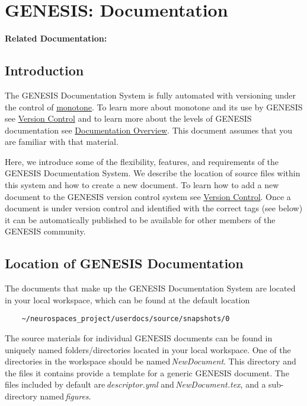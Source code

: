 \documentclass[12pt]{article}
\begin{document}
\section*{GENESIS: Documentation}

{\bf Related Documentation:}

\subsection*{Introduction}

The GENESIS Documentation System is fully automated with versioning under the control of \href{http://monotone.ca/}{monotone}. To learn more about monotone and its use by GENESIS see \href{../version-control/version-control.tex}{Version Control} and to learn more about the levels of GENESIS documentation see \href{../documentation-overview/documentation-overview.tex}{Documentation Overview}. This document assumes that you are familiar with that material.

Here, we introduce some of the flexibility, features, and requirements of the GENESIS Documentation System. We describe the location of source files within this system and how to create a new document. To learn how to add a new document to the GENESIS version control system see \href{../version-control/version-control.tex}{Version Control}. Once a document is under version control and identified with the correct tags (see below) it can be automatically published to be available for other members of the GENESIS community.

\subsection*{Location of GENESIS Documentation}

The documents that make up the GENESIS Documentation System are located in your local workspace, which can be found at the default location
\begin{verbatim}
    ~/neurospaces_project/userdocs/source/snapshots/0
\end{verbatim}
The source materials for individual GENESIS documents can be found in uniquely named folders/directories located in your local workspace. One of the directories in the workspace should be named\,{\it NewDocument}. This directory and the files it contains provide a template for a generic GENESIS document. The files included by default are\,{\it descriptor.yml} and\,{\it NewDocument.tex}, and a sub-directory named\,{\it figures}.
\end{document}
